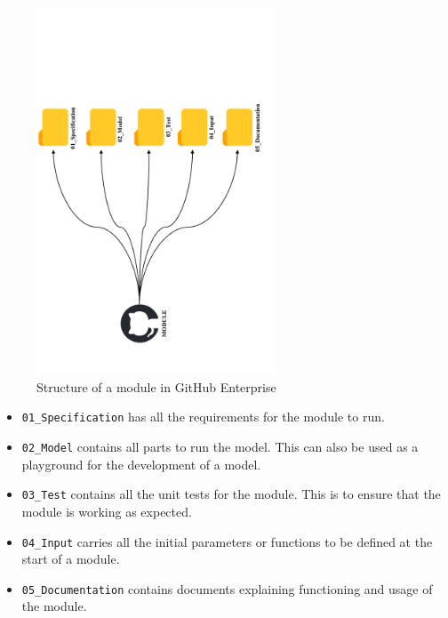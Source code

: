 \begin{figure}[!ht]
    \centering
    \includegraphics[width=0.63\textwidth, angle=-90]{Images/github_folder_structure_2.pdf}
    \caption{Structure of a module in GitHub Enterprise}
    \label{github_arrhenius}
\end{figure}
\newpage
\begin{itemize}
    \item \verb|01_Specification| has all the requirements for the module to run.
    \item \verb|02_Model| contains all parts to run the model. This can also be used as a playground for the development of a model.
    \item \verb|03_Test| contains all the unit tests for the module. This is to ensure that the module is working as expected.
    \item \verb|04_Input| carries all the initial parameters or functions to be defined at the start of a module.
    \item \verb|05_Documentation| contains documents explaining functioning and usage of the module.
\end{itemize}

